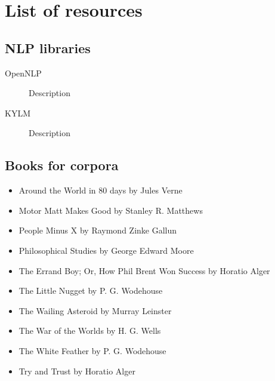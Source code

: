 \section{List of resources}
\subsection*{NLP libraries}
\label{sec:resources}
\begin{description}
\item[OpenNLP]{Description}
\item[KYLM]{Description}
\end{description}
\subsection*{Books for corpora}
\begin{itemize}
	\item{Around the World in 80 days by Jules Verne}
	\item{Motor Matt Makes Good by Stanley R. Matthews}
	\item{People Minus X by Raymond Zinke Gallun}
	\item{Philosophical Studies by George Edward Moore}
	\item{The Errand Boy; Or, How Phil Brent Won Success by Horatio Alger}
	\item{The Little Nugget by P. G. Wodehouse}
	\item{The Wailing Asteroid by Murray Leinster}
	\item{The War of the Worlds by H. G. Wells}
	\item{The White Feather by P. G. Wodehouse}
	\item{Try and Trust by Horatio Alger}
\end{itemize}